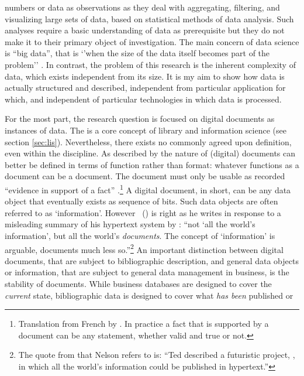 numbers or data as observations as they deal with aggregating, filtering, and
visualizing large sets of data, based on statistical methods of data analysis.
Such analyses require a basic understanding of data as prerequisite but they do
not make it to their primary object of investigation.  The main concern of data
science is ``big data'', that is `'when the size of the data itself becomes
part of the problem'' \cite{Loukides2010}. In contrast, the problem of this
research is the inherent complexity of data, which exists independent from its
size. It is my aim to show how data is actually structured and described,
independent from particular application for which, and independent of
particular technologies in which data is processed.

For the most part, the research question is focused on digital documents as
instances of data. The  is a core concept of library and
information science (see section \ref{sec:lis}).  Nevertheless, there exists no
commonly agreed upon definition, even within the discipline. As described by
\textcite{Buckland1997, Buckland1998b} the nature of (digital) documents can
better be defined in terms of function rather than format: whatever functions
as a document can be a document. The document must only be usable as recorded
``evidence in support of a fact'' \cite{Briet1951}.\footnote{Translation from
French by \textcite{Buckland1997}.  In practice a fact that is supported by a
document can be any statement, whether valid and true or not.} A digital
document, in short, can be any data object that eventually exists as sequence
of bits. Such data objects are often referred to as `information'. However
~(\citeyear[300]{Nelson2010}) is right as he writes in
response to a misleading summary of his hypertext system  by
: ``not `all the world's information', but all the
world's \emph{documents}. The concept of `information' is arguable, documents
much less so.''\footnote{\label{fn:nsl}The quote from \textcite{BernersLee1999}
that Nelson refers to is: ``Ted described a futuristic project, ,
in which all the world's information could be published in hypertext.''} An
important distinction between digital documents, that are subject to
bibliographic description, and general data objects or information, that are
subject to general data management in business, is the stability of documents.
While business databases are designed to cover the \emph{current} state,
bibliographic data is designed to cover what \emph{has been} published or
